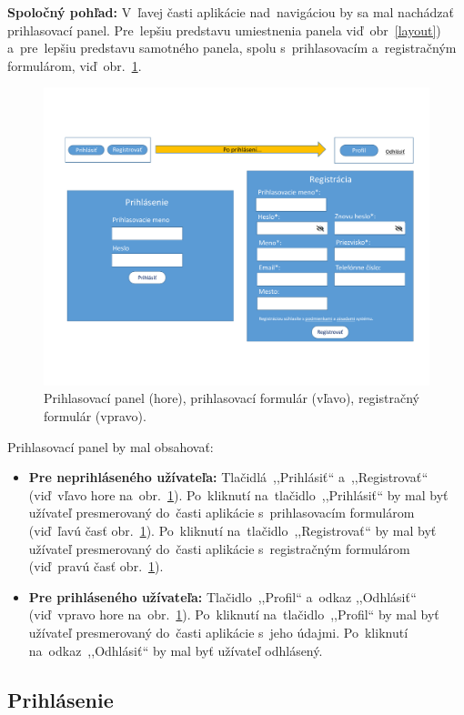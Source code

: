 \textbf{Spoločný pohľad:} V~ľavej časti aplikácie nad~navigáciou by sa mal nachádzať prihlasovací panel. Pre~lepšiu predstavu umiestnenia panela viď~obr~\ref{layout}) a~pre~lepšiu predstavu samotného panela, spolu s~prihlasovacím a~registračným formulárom, viď~obr.~\ref{auth}.

\begin{figure}[H]\centering
\includegraphics[width=140mm]{../img/UI concept/auth}
\caption{Prihlasovací panel (hore), prihlasovací formulár (vľavo), registračný formulár (vpravo).}
\label{auth}
\end{figure}

Prihlasovací panel by mal obsahovať:
\begin{itemize}
\item \textbf{Pre neprihláseného užívateľa:}
Tlačidlá~,,Prihlásiť`` a~,,Registrovať`` (viď~vľavo hore na~obr.~\ref{auth}). Po~kliknutí na~tlačidlo~,,Prihlásiť`` by mal byť užívateľ presmerovaný do~časti aplikácie s~prihlasovacím formulárom (viď~ľavú časť obr.~\ref{auth}). Po~kliknutí na~tlačidlo~,,Registrovať`` by mal byť užívateľ presmerovaný do~časti aplikácie s~registračným formulárom (viď~pravú časť obr.~\ref{auth}).
\item \textbf{Pre prihláseného užívateľa:}
Tlačidlo~,,Profil`` a~odkaz ,,Odhlásiť`` (viď~vpravo hore na~obr.~\ref{auth}). Po~kliknutí na~tlačidlo~,,Profil`` by mal byť užívateľ presmerovaný do~časti aplikácie s~jeho údajmi. Po~kliknutí na~odkaz~,,Odhlásiť`` by mal byť užívateľ odhlásený.
\end{itemize}

\subsection{Prihlásenie}
\label{prihlasenie}

